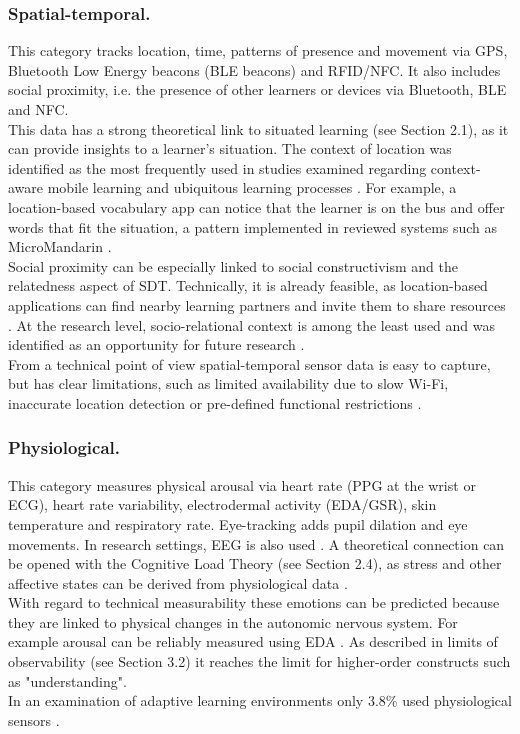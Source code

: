\documentclass[runningheads]{llncs}
\begin{document}
\subsubsection{Spatial-temporal.}
This category tracks location, time, patterns of presence and movement via GPS, Bluetooth Low Energy beacons (BLE beacons) and RFID/NFC. It also includes social proximity, i.e. the presence of other learners or devices via Bluetooth, BLE and NFC. \\
This data has a strong theoretical link to situated learning (see Section 2.1), as it can provide insights to a learner’s situation.
The context of location was identified as the most frequently used in studies examined regarding context-aware mobile learning and ubiquitous learning processes \cite{vallejo-correa_systematic_2021}.  For example, a location-based vocabulary app can notice that the learner is on the bus and offer words that fit the situation, a pattern implemented in reviewed systems such as MicroMandarin \cite{lee_systematic_2022}.\\ %
Social proximity can be especially linked to social constructivism and the relatedness aspect of SDT. Technically, it is already feasible, as location-based applications can find nearby learning partners and invite them to share resources \cite{gumbheer_personalized_2022}. At the research level, socio-relational context is among the least used and was identified as an opportunity for future research \cite{vallejo-correa_systematic_2021}.\\ %
From a technical point of view spatial-temporal sensor data is easy to capture, but has clear limitations, such as limited availability due to slow Wi-Fi, inaccurate location detection or pre-defined functional restrictions \cite{lee_systematic_2022}.

\subsubsection{Physiological.}
This category measures physical arousal via heart rate (PPG at the wrist or ECG), heart rate variability, electrodermal activity (EDA/GSR), skin temperature and respiratory rate. Eye-tracking adds pupil dilation and eye movements. In research settings, EEG is also used \cite{hong_advances_2025}. A theoretical connection can be opened with the Cognitive Load Theory (see Section 2.4), as stress and other affective states can be derived from physiological data \cite{youssef_when_2025}.\\
With regard to technical measurability these emotions can be predicted because they are linked to physical changes in the autonomic nervous system. For example arousal can be reliably measured using EDA \cite{di_mitri_signals_2018}. As described in limits of observability (see Section 3.2) it reaches the limit for higher-order constructs such as "understanding". \\
In an examination of adaptive learning environments only 3.8\% used physiological sensors \cite{hasanov_survey_2019}.
\end{document}
